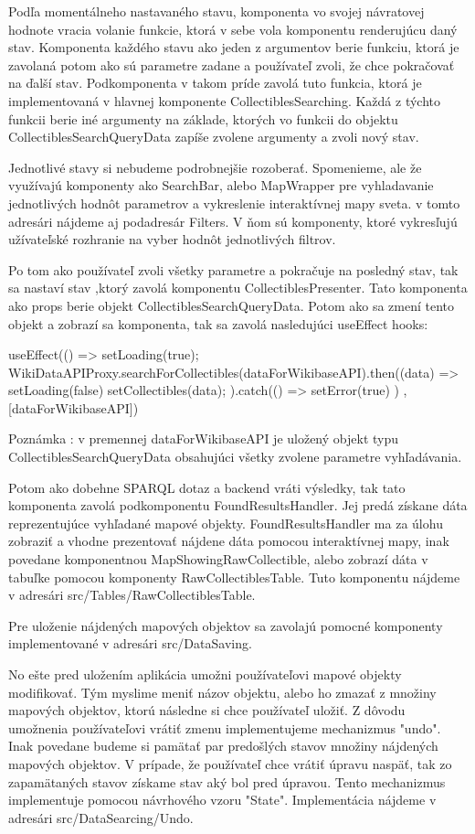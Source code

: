 Podľa momentálneho nastavaného stavu, komponenta vo svojej návratovej hodnote vracia volanie funkcie, ktorá v sebe vola komponentu renderujúcu daný stav. Komponenta každého stavu ako jeden z argumentov berie 
funkciu, ktorá je zavolaná potom ako sú parametre zadane a používateľ zvoli, že chce pokračovať na ďalší stav. Podkomponenta v takom príde zavolá tuto funkcia, ktorá je implementovaná v hlavnej komponente CollectiblesSearching. 
Každá z týchto funkcii berie iné argumenty na základe, ktorých vo funkcii do objektu CollectiblesSearchQueryData zapíše zvolene argumenty a zvoli nový stav. 

Jednotlivé stavy si nebudeme podrobnejšie rozoberať. Spomenieme, ale že využívajú komponenty ako SearchBar, alebo MapWrapper pre vyhladavanie jednotlivých hodnôt parametrov a vykreslenie interaktívnej mapy sveta. 
v tomto adresári nájdeme aj podadresár Filters. V ňom sú komponenty, ktoré vykresľujú užívateľské rozhranie na vyber hodnôt jednotlivých filtrov. 

Po tom ako používateľ zvoli všetky parametre a pokračuje na posledný stav, tak sa nastaví stav ,ktorý zavolá komponentu CollectiblesPresenter. 
Tato komponenta ako props berie objekt CollectiblesSearchQueryData. Potom ako sa zmení tento objekt a zobrazí sa komponenta, tak sa zavolá nasledujúci useEffect hooks: 
\begin{code}
useEffect(() => {
      setLoading(true);
      WikiDataAPIProxy.searchForCollectibles(dataForWikibaseAPI).then((data) => {
            setLoading(false)
            setCollectibles(data);
      }).catch(() =>
            setError(true)
      )
}, [dataForWikibaseAPI])     
\end{code}
Poznámka : v premennej dataForWikibaseAPI je uložený objekt typu CollectiblesSearchQueryData obsahujúci všetky zvolene parametre vyhľadávania. 

Potom ako dobehne SPARQL dotaz a backend vráti výsledky, tak tato komponenta zavolá podkomponentu FoundResultsHandler. Jej predá získane dáta reprezentujúce vyhľadané mapové objekty. 
FoundResultsHandler ma za úlohu zobraziť a vhodne prezentovať nájdene dáta pomocou interaktívnej mapy, inak povedane komponentnou MapShowingRawCollectible, alebo zobrazí dáta v tabuľke pomocou komponenty RawCollectiblesTable. 
Tuto komponentu nájdeme v adresári src/Tables/RawCollectiblesTable. 

Pre uloženie nájdených mapových objektov sa zavolajú pomocné komponenty implementované v adresári src/DataSaving. 

No ešte pred uložením aplikácia umožni používateľovi mapové objekty modifikovať. Tým myslime meniť názov objektu, alebo ho zmazať z množiny mapových objektov, ktorú následne si chce používateľ uložiť. 
Z dôvodu umožnenia používateľovi vrátiť zmenu implementujeme mechanizmus "undo". Inak povedane budeme si pamätať par predošlých stavov množiny nájdených mapových objektov. V prípade, že používateľ chce vrátiť úpravu naspäť, tak  
zo zapamätaných stavov získame stav aký bol pred úpravou. Tento mechanizmus implementuje pomocou návrhového vzoru "State". Implementácia nájdeme v adresári src/DataSearcing/Undo. 


